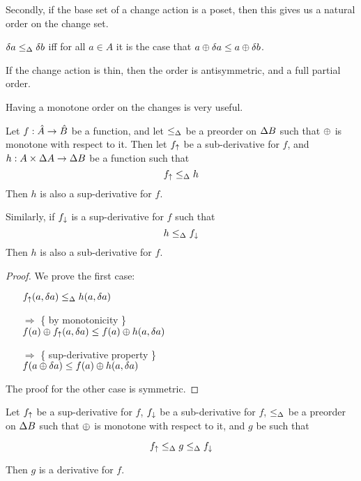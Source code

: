 Secondly, if the base set of a change action is a poset, then this gives us a natural
order on the change set.

\begin{defn}
  $\delta a \leq_\Delta \delta b$ iff for all $a \in A$ it is the case that $a \oplus \delta a \leq a \oplus \delta b$.
\end{defn}

If the change action is thin, then the order is antisymmetric, and a
full partial order.

Having a monotone order on the changes is very useful.

\begin{thm}
  Let $f: \hat{A} \rightarrow \hat{B}$ be a function, and let $\leq_\Delta$ be a preorder on $\Delta B$ such that $\oplus$ is monotone with
  respect to it. Then let $f_\uparrow$ be a sub-derivative for $f$, and $h: A \times
  \Delta A \rightarrow \Delta B$ be a function such that
  $$f_\uparrow \leq_\Delta h$$
  Then $h$ is also a sup-derivative for $f$.

  Similarly, if $f_\downarrow$ is a sup-derivative for $f$ such that
  $$h \leq_\Delta f_\downarrow$$
  Then $h$ is also a sub-derivative for $f$.
\end{thm}
\ifproofs
\begin{proof}
  We prove the first case:
  \begin{itemize}
    \item[ ]$f_\uparrow(a, \delta a) \leq_\Delta h(a, \delta a)$
    \item[$\Rightarrow$]\{ by monotonicity \}\\
      $f(a) \oplus f_\uparrow(a, \delta a) \leq f(a) \oplus h(a, \delta a)$
    \item[$\Rightarrow$]\{ sup-derivative property \}\\
      $f(a \oplus \delta a) \leq f(a) \oplus h(a, \delta a)$
  \end{itemize}

  The proof for the other case is symmetric.
\end{proof}
\fi

\begin{thm}
  \label{thm:sandwich}
  Let $f_\uparrow$ be a sup-derivative for $f$, $f_\downarrow$ be a sub-derivative for $f$, $\leq_\Delta$ be a preorder on $\Delta B$ such that $\oplus$ is monotone with
  respect to it, and $g$ be such that

  $$f_\uparrow \leq_\Delta g \leq_\Delta f_\downarrow$$

  Then $g$ is a derivative for $f$.
\end{thm}

